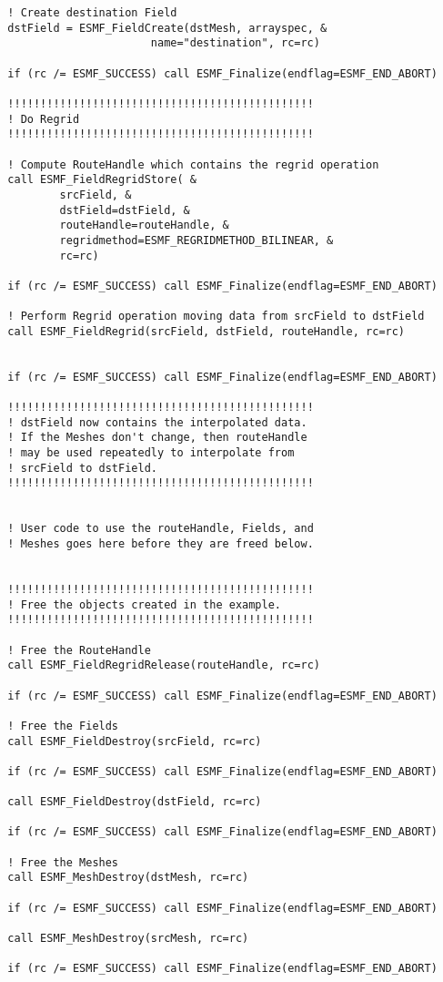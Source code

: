 \begin{verbatim}
  ! Create destination Field
  dstField = ESMF_FieldCreate(dstMesh, arrayspec, &
                        name="destination", rc=rc)

  if (rc /= ESMF_SUCCESS) call ESMF_Finalize(endflag=ESMF_END_ABORT)

  !!!!!!!!!!!!!!!!!!!!!!!!!!!!!!!!!!!!!!!!!!!!!!!
  ! Do Regrid
  !!!!!!!!!!!!!!!!!!!!!!!!!!!!!!!!!!!!!!!!!!!!!!!

  ! Compute RouteHandle which contains the regrid operation
  call ESMF_FieldRegridStore( &
          srcField, &
          dstField=dstField, &
          routeHandle=routeHandle, &
          regridmethod=ESMF_REGRIDMETHOD_BILINEAR, &
          rc=rc)

  if (rc /= ESMF_SUCCESS) call ESMF_Finalize(endflag=ESMF_END_ABORT)

  ! Perform Regrid operation moving data from srcField to dstField
  call ESMF_FieldRegrid(srcField, dstField, routeHandle, rc=rc)


  if (rc /= ESMF_SUCCESS) call ESMF_Finalize(endflag=ESMF_END_ABORT)

  !!!!!!!!!!!!!!!!!!!!!!!!!!!!!!!!!!!!!!!!!!!!!!!
  ! dstField now contains the interpolated data.
  ! If the Meshes don't change, then routeHandle
  ! may be used repeatedly to interpolate from 
  ! srcField to dstField.  
  !!!!!!!!!!!!!!!!!!!!!!!!!!!!!!!!!!!!!!!!!!!!!!!

   
  ! User code to use the routeHandle, Fields, and
  ! Meshes goes here before they are freed below.


  !!!!!!!!!!!!!!!!!!!!!!!!!!!!!!!!!!!!!!!!!!!!!!!
  ! Free the objects created in the example.
  !!!!!!!!!!!!!!!!!!!!!!!!!!!!!!!!!!!!!!!!!!!!!!!

  ! Free the RouteHandle
  call ESMF_FieldRegridRelease(routeHandle, rc=rc)

  if (rc /= ESMF_SUCCESS) call ESMF_Finalize(endflag=ESMF_END_ABORT)

  ! Free the Fields
  call ESMF_FieldDestroy(srcField, rc=rc)

  if (rc /= ESMF_SUCCESS) call ESMF_Finalize(endflag=ESMF_END_ABORT)

  call ESMF_FieldDestroy(dstField, rc=rc)

  if (rc /= ESMF_SUCCESS) call ESMF_Finalize(endflag=ESMF_END_ABORT)

  ! Free the Meshes
  call ESMF_MeshDestroy(dstMesh, rc=rc)

  if (rc /= ESMF_SUCCESS) call ESMF_Finalize(endflag=ESMF_END_ABORT)

  call ESMF_MeshDestroy(srcMesh, rc=rc)
 
  if (rc /= ESMF_SUCCESS) call ESMF_Finalize(endflag=ESMF_END_ABORT)

 
\end{verbatim}

\setlength{\parskip}{\oldparskip}
\setlength{\parindent}{\oldparindent}
\setlength{\baselineskip}{\oldbaselineskip}
